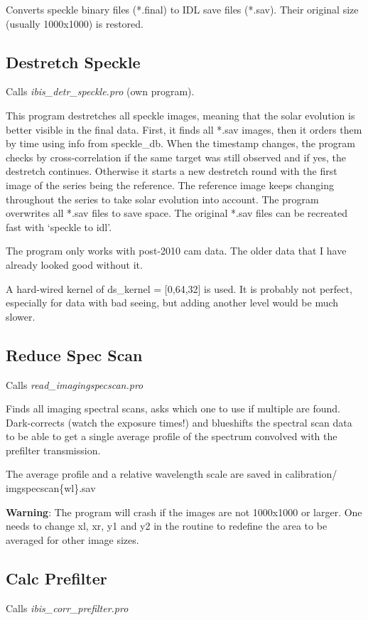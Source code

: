 \documentclass[a4paper,11pt]{article}
\begin{document}
Converts speckle binary files (*.final) to IDL save files (*.sav). Their original size (usually 1000x1000) is restored.

\subsection{Destretch Speckle}
\label{destrsp}

Calls \textit{ibis\_detr\_speckle.pro} (own program).

This program destretches all speckle images, meaning that the solar evolution is better visible in the final data. First, it finds all *.sav images, then it orders them by time using info from speckle\_db. When the timestamp changes, the program checks by cross-correlation if the same target was still observed and if yes, the destretch continues. Otherwise it starts a new destretch round with the first image of the series being the reference. The reference image keeps changing throughout the series to take solar evolution into account. The program overwrites all *.sav files to save space. The original *.sav files can be recreated fast with `speckle to idl'.

The program only works with post-2010 cam data. The older data that I have already looked good without it.

A hard-wired kernel of  ds\_kernel = [0,64,32] is used. It is probably not perfect, especially for data with bad seeing, but adding another level would be much slower.


\subsection{Reduce Spec Scan}
Calls \textit{read\_imagingspecscan.pro}

Finds all imaging spectral scans, asks which one to use if multiple are found. Dark-corrects (watch the exposure times!) and blueshifts the spectral scan data to be able to get a single average profile of the spectrum convolved with the prefilter transmission.

The average profile and a relative wavelength scale are saved in calibration/ imgspecscan\{wl\}.sav

\textbf{Warning}: The program will crash if the images are not 1000x1000 or larger. One needs to change xl, xr, y1 and y2 in the routine to redefine the area to be averaged for other image sizes.

\subsection{Calc Prefilter}
Calls \textit{ibis\_corr\_prefilter.pro}
\end{document}
